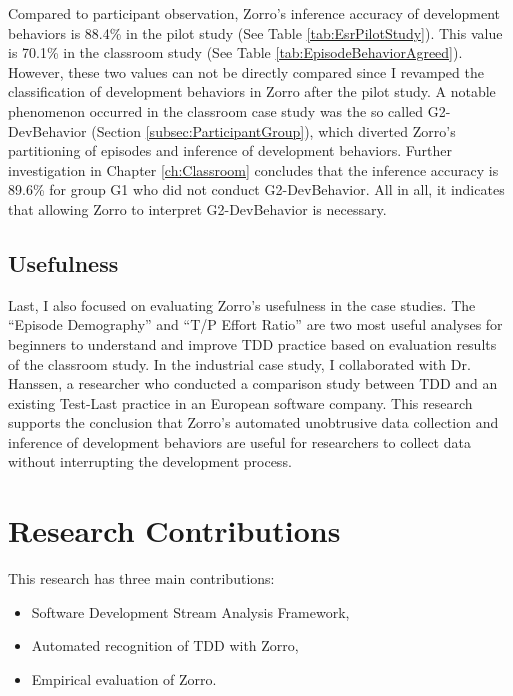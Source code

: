 Compared to participant observation, Zorro's inference accuracy of development behaviors is 88.4\% in the pilot study (See Table \ref{tab:EsrPilotStudy}). This value is 70.1\% in the classroom study (See Table \ref{tab:EpisodeBehaviorAgreed}). However, these two values can not be directly compared since I revamped the classification of development behaviors in Zorro after the pilot study. A notable phenomenon occurred in the classroom case study was the so called G2-DevBehavior (Section \ref{subsec:ParticipantGroup}), which diverted Zorro's partitioning of episodes and inference of development behaviors. Further investigation in Chapter \ref{ch:Classroom} concludes that the inference accuracy is 89.6\% for group G1 who did not conduct G2-DevBehavior. All in all, it indicates that allowing Zorro to interpret G2-DevBehavior is necessary.  


\subsection{Usefulness}
Last, I also focused on evaluating Zorro's usefulness in the case studies. The ``Episode Demography'' and ``T/P Effort Ratio'' are two most useful analyses for beginners to understand and improve TDD practice based on evaluation results of the classroom study. In the industrial case study, I collaborated with Dr. Hanssen, a researcher who conducted a comparison study between TDD and an existing Test-Last practice in an European software company. This research supports the conclusion that Zorro's automated unobtrusive data collection and inference of development behaviors are useful for researchers to collect data without interrupting the development process. 

\section{Research Contributions}
\label{sec:Contributions}
This research has three main contributions: 
\begin{itemize}
\item Software Development Stream Analysis Framework,
\item Automated recognition of TDD with Zorro,
\item Empirical evaluation of Zorro.
\end{itemize}

